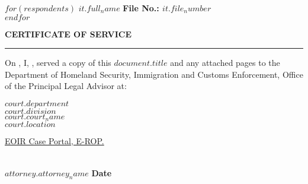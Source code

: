 \documentclass[12pt]{article}
\date{}
\begin{document}
$for(respondents)$
\noindent\textbf{\large $it.full_name$} \hfill \textbf{File No.: $it.file_number$} \\
$endfor$

\vspace{2em}

\begin{center}
    {\Large \textbf{CERTIFICATE OF SERVICE}}\\
    \rule{0.65\textwidth}{0.6pt} %
\end{center}

\vspace{2em}

\justifying
\noindent On \uline{\hspace{3cm}}, I, \uline{\hspace{10cm}}, served a copy of this \uline{$document.title$} and any attached pages to the Department of Homeland Security, Immigration and Customs Enforcement, Office of the Principal Legal Advisor at:

\vspace{1em}

\begin{flushleft}  
  \hspace{2em} \uline{$court.department$}\\
  \hspace{2em} \uline{$court.division$}\\
  \hspace{2em} \uline{$court.court_name$}\\
  \hspace{2em} \uline{$court.location$}
\end{flushleft}

\vspace{2em}

\noindent {} \underline{EOIR Case Portal, E-ROP.}

\vspace{4em}

\noindent\makebox[0.45\textwidth]{\hrulefill} \hfill \makebox[0.45\textwidth]{\hrulefill}\\
\noindent\textbf{$attorney.attorney_name$} \hfill \textbf{Date}
\end{document}
